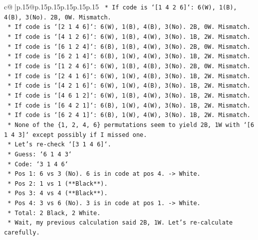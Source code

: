 \documentclass{article}
\begin{document}
{\begin{supertabular}{c@{$\;$}|p{.15\linewidth}@{}p{.15\linewidth}p{.15\linewidth}p{.15\linewidth}p{.15\linewidth}p{.15\linewidth}}
{{{\texttt{            *   If code is `{[}1 4 2 6{]}`: 6(W), 1(B), 4(B), 3(No). 2B, 0W. Mismatch.} \\
\texttt{            *   If code is `{[}2 1 4 6{]}`: 6(W), 1(B), 4(B), 3(No). 2B, 0W. Mismatch.} \\
\texttt{            *   If code is `{[}4 1 2 6{]}`: 6(W), 1(B), 4(W), 3(No). 1B, 2W. Mismatch.} \\
\texttt{            *   If code is `{[}6 1 2 4{]}`: 6(B), 1(B), 4(W), 3(No). 2B, 0W. Mismatch.} \\
\texttt{            *   If code is `{[}6 2 1 4{]}`: 6(B), 1(W), 4(W), 3(No). 1B, 2W. Mismatch.} \\
\texttt{            *   If code is `{[}1 2 4 6{]}`: 6(W), 1(B), 4(B), 3(No). 2B, 0W. Mismatch.} \\
\texttt{            *   If code is `{[}2 4 1 6{]}`: 6(W), 1(W), 4(B), 3(No). 1B, 2W. Mismatch.} \\
\texttt{            *   If code is `{[}4 2 1 6{]}`: 6(W), 1(W), 4(B), 3(No). 1B, 2W. Mismatch.} \\
\texttt{            *   If code is `{[}4 6 1 2{]}`: 6(W), 1(B), 4(W), 3(No). 1B, 2W. Mismatch.} \\
\texttt{            *   If code is `{[}6 4 2 1{]}`: 6(B), 1(W), 4(W), 3(No). 1B, 2W. Mismatch.} \\
\texttt{            *   If code is `{[}6 2 4 1{]}`: 6(B), 1(W), 4(W), 3(No). 1B, 2W. Mismatch.} \\
\texttt{        *   None of the \{1, 2, 4, 6\} permutations seem to yield 2B, 1W with `{[}6 1 4 3{]}` except possibly if I missed one.} \\
\texttt{        *   Let's re{-}check `{[}3 1 4 6{]}`.} \\
\texttt{            *   Guess: `6 1 4 3`} \\
\texttt{            *   Code: `3 1 4 6`} \\
\texttt{            *   Pos 1: 6 vs 3 (No). 6 is in code at pos 4. {-}> White.} \\
\texttt{            *   Pos 2: 1 vs 1 (**Black**).} \\
\texttt{            *   Pos 3: 4 vs 4 (**Black**).} \\
\texttt{            *   Pos 4: 3 vs 6 (No). 3 is in code at pos 1. {-}> White.} \\
\texttt{            *   Total: 2 Black, 2 White.} \\
\texttt{            *   Wait, my previous calculation said 2B, 1W. Let's re{-}calculate carefully.} \\
}}}
\end{supertabular}}
\end{document}
